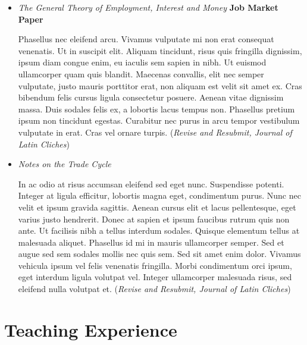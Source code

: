 \documentclass{article}[12]
\begin{document}
\begin{itemize}[itemsep=1.5em]

\item \emph{The General Theory of Employment, Interest and Money} \hfill \textbf{Job Market Paper}

Phasellus nec eleifend arcu. Vivamus vulputate mi non erat consequat venenatis. Ut in suscipit elit. Aliquam tincidunt, risus quis fringilla dignissim, ipsum diam congue enim, eu iaculis sem sapien in nibh. Ut euismod ullamcorper quam quis blandit. Maecenas convallis, elit nec semper vulputate, justo mauris porttitor erat, non aliquam est velit sit amet ex. Cras bibendum felis cursus ligula consectetur posuere. Aenean vitae dignissim massa. Duis sodales felis ex, a lobortis lacus tempus non. Phasellus pretium ipsum non tincidunt egestas. Curabitur nec purus in arcu tempor vestibulum vulputate in erat. Cras vel ornare turpis. 
(\emph{Revise and Resubmit, Journal of Latin Cliches})

\item \emph{Notes on the Trade Cycle} 

In ac odio at risus accumsan eleifend sed eget nunc. Suspendisse potenti. Integer at ligula efficitur, lobortis magna eget, condimentum purus. Nunc nec velit et ipsum gravida sagittis. Aenean cursus elit et lacus pellentesque, eget varius justo hendrerit. Donec at sapien et ipsum faucibus rutrum quis non ante. Ut facilisis nibh a tellus interdum sodales. Quisque elementum tellus at malesuada aliquet. Phasellus id mi in mauris ullamcorper semper. Sed et augue sed sem sodales mollis nec quis sem. Sed sit amet enim dolor. Vivamus vehicula ipsum vel felis venenatis fringilla. Morbi condimentum orci ipsum, eget interdum ligula volutpat vel. Integer ullamcorper malesuada risus, sed eleifend nulla volutpat et. (\emph{Revise and Resubmit, Journal of Latin Cliches})

\end{itemize}




\section{Teaching Experience}
\end{document}
